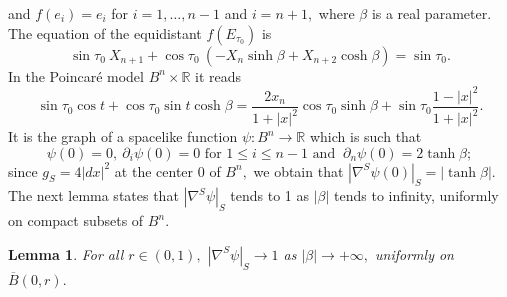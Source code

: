 \documentclass[10pt,reqno,oneside]{amsart}
\newtheorem{lem}{Lemma}[section]
\theoremstyle{definition}
\theoremstyle{remark}
\newcommand{\R}{\mathbb{R}}
\begin{document}
and $f(e_i)=e_i$ for $i=1,\ldots,n-1$ and $i=n+1,$ where $\beta$ is a real parameter. The equation of the equidistant $f(E_{\tau_0})$ is
$$\sin\tau_0\ X_{n+1}+\cos\tau_0\ \left(-X_n\sinh\beta+X_{n+2}\cosh\beta\right)=\sin\tau_0.$$
In the Poincar\'e model $B^n\times\R$ it reads
\begin{equation}\label{app eqn u equidistant phi} 
\sin\tau_0\cos t+\cos\tau_0\sin t\cosh\beta=\frac{2x_n}{1+|x|^2}\cos\tau_0\sinh\beta+\sin\tau_0\frac{1-|x|^2}{1+|x|^2}.
\end{equation}
It is the graph of a spacelike function $\psi:B^n\rightarrow\R$ which is such that
\begin{equation}\label{app u partial u phi}
\psi(0)=0,\ \partial_i\psi(0)=0\mbox{ for } 1\leq i\leq n-1\mbox{ and }\ \partial_n\psi(0)=2\tanh\beta;
\end{equation}
since $g_S=4|dx|^2$ at the center $0$ of $B^n,$ we obtain that $|\nabla^S\psi(0)|_S=|\tanh\beta|.$ The next lemma states that $|\nabla^S\psi|_S$ tends to 1 as $|\beta|$ tends to infinity, uniformly on compact subsets of $B^n.$
\begin{lem}\label{app norm nabla u tends 1}
For all $r\in (0,1),$ $|\nabla^S\psi|_S\rightarrow 1$ as $|\beta|\rightarrow+\infty,$ uniformly on $\overline{B}(0,r).$
\end{lem}
\end{document}
